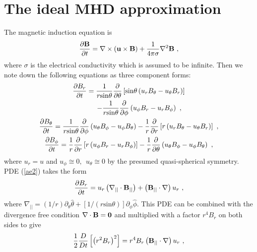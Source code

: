 \documentclass[fleqn,usenatbib]{mnras}
\begin{document}

\appendix
\section{The ideal MHD approximation}
\label{a1}
The magnetic induction equation is
\begin{gather}
\frac{\partial \bf{B}}{\partial t}=\nabla\times \left(\bf{u}\times\bf{B}\right)+\frac{1}{4\pi\sigma}\nabla^{2} \bf{B}\ ,
\end{gather}
where $\sigma$ is the electrical conductivity which is assumed to be infinite. Then we note down the following equations as three component forms:
\begin{gather}
\frac{\partial B_{r}}{\partial t}=\frac{1}{r\mathrm{sin}\theta}\frac{\partial}{\partial\theta}\left[\mathrm{sin}\theta \left(u_{r}B_{\theta}-u_{\theta}B_{r}\right)\right]\notag \\
\quad \quad \quad -\frac{1}{r\mathrm{sin}\theta}\frac{\partial}{\partial\phi}\left(u_{\phi}B_{r}-u_{r}B_{\phi}\right)\ ,\label{ae2}\\
\frac{\partial B_{\theta}}{\partial t}=\frac{1}{r\mathrm{sin}\theta}\frac{\partial}{\partial\phi}\left(u_{\theta}B_{\phi}-u_{\phi}B_{\theta}\right)-\frac{1}{r}\frac{\partial}{\partial r}\left[r\left(u_{r}B_{\theta}-u_{\theta}B_{r}\right)\right]\ ,\label{ae3}\\
\frac{\partial B_{\phi}}{\partial t}=\frac{1}{r}\frac{\partial}{\partial r}\left[r\left(u_{\phi}B_{r}-u_{r}B_{\phi}\right)\right]-\frac{1}{r}\frac{\partial}{\partial\theta}\left(u_{\theta}B_{\phi}-u_{\phi}B_{\theta}\right)\ ,\label{ae4}
\end{gather}
where $u_{r}=u$ and $u_{\phi}\cong 0, \ \ u_{\theta}\cong 0$ by the presumed quasi-spherical symmetry.
PDE (\ref{ae2}) takes the form
\begin{gather}
\frac{\partial B_{r}}{\partial t}=u_{r}\left(\nabla_{||}\cdot \bf{B_{||}}\right)+\left(\bf{B_{||}}\cdot\nabla\right)u_{r}\ ,
\end{gather}
where $\nabla_{||}=\left(1/r\right)\partial_{\theta}\widehat{\theta}+\left[1/\left(r\mathrm{sin}\theta\right)\right]\partial_{\phi}\widehat{\phi}$. 
This PDE can be combined with the divergence free condition $\nabla\cdot \bf{B}=0$ and multiplied with a factor $r^{4}B_{r}$ on both sides to give
\begin{equation}
\frac{1}{2}\frac{D}{Dt}\left[\left( r^{2}B_{r}\right)^{2}\right]=r^{4}B_{r}\left(\bf{B_{||}}\cdot\nabla\right)u_{r}\ ,
\end{equation}
\end{document}
